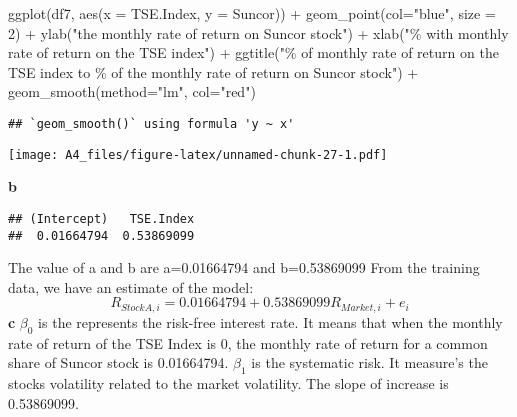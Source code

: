 \documentclass[
]{article}
\newenvironment{Shaded}{\begin{snugshade}}{\end{snugshade}}
\newcommand{\AttributeTok}[1]{\textcolor[rgb]{0.77,0.63,0.00}{#1}}
\newcommand{\DecValTok}[1]{\textcolor[rgb]{0.00,0.00,0.81}{#1}}
\newcommand{\FunctionTok}[1]{\textcolor[rgb]{0.00,0.00,0.00}{#1}}
\newcommand{\NormalTok}[1]{#1}
\newcommand{\OtherTok}[1]{\textcolor[rgb]{0.56,0.35,0.01}{#1}}
\newcommand{\SpecialCharTok}[1]{\textcolor[rgb]{0.00,0.00,0.00}{#1}}
\newcommand{\StringTok}[1]{\textcolor[rgb]{0.31,0.60,0.02}{#1}}
\begin{document}
\begin{Shaded}
\begin{Highlighting}[]
\FunctionTok{ggplot}\NormalTok{(df7, }\FunctionTok{aes}\NormalTok{(}\AttributeTok{x =}\NormalTok{ TSE.Index, }\AttributeTok{y =}\NormalTok{ Suncor)) }\SpecialCharTok{+} \FunctionTok{geom\_point}\NormalTok{(}\AttributeTok{col=}\StringTok{"blue"}\NormalTok{, }\AttributeTok{size =} \DecValTok{2}\NormalTok{) }\SpecialCharTok{+} \FunctionTok{ylab}\NormalTok{(}\StringTok{"the monthly rate of return on Suncor stock"}\NormalTok{) }\SpecialCharTok{+} \FunctionTok{xlab}\NormalTok{(}\StringTok{"\% with monthly rate of return on the TSE index"}\NormalTok{) }\SpecialCharTok{+} \FunctionTok{ggtitle}\NormalTok{(}\StringTok{"\% of monthly rate of return on the TSE index to \% of the monthly rate of return on Suncor stock"}\NormalTok{) }\SpecialCharTok{+} \FunctionTok{geom\_smooth}\NormalTok{(}\AttributeTok{method=}\StringTok{"lm"}\NormalTok{, }\AttributeTok{col=}\StringTok{"red"}\NormalTok{)}
\end{Highlighting}
\end{Shaded}

\begin{verbatim}
## `geom_smooth()` using formula 'y ~ x'
\end{verbatim}

\texttt{[image: A4\_files/figure-latex/unnamed-chunk-27-1.pdf]}

\textbf{b}

\begin{Shaded}
\end{Shaded}

\begin{verbatim}
## (Intercept)   TSE.Index 
##  0.01664794  0.53869099
\end{verbatim}

The value of a and b are a=0.01664794 and b=0.53869099 From the training
data, we have an estimate of the model: \[
R_{StockA,i} = 0.01664794   + 0.53869099 R_{Market, i} + e_{i}   
\] \textbf{c} \(\beta_{0}\) is the represents the risk-free interest
rate. It means that when the monthly rate of return of the TSE Index is
0, the monthly rate of return for a common share of Suncor stock is
0.01664794. \(\beta_{1}\) is the systematic risk. It measure's the
stocks volatility related to the market volatility. The slope of
increase is 0.53869099.
\end{document}
